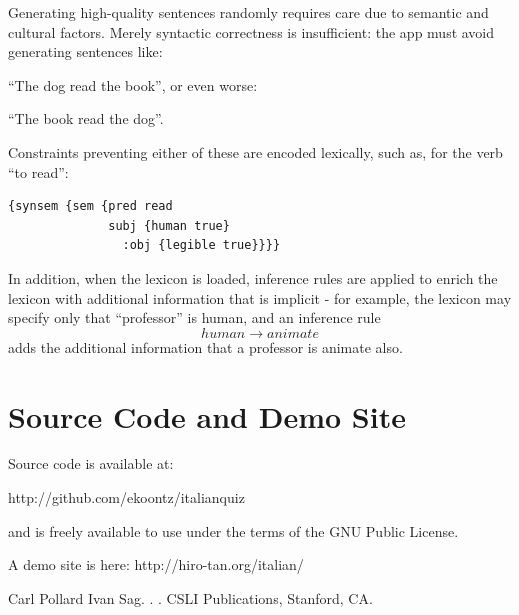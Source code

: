 \documentclass[11pt]{article}
\begin{document}
Generating high-quality sentences randomly requires care due to
semantic and cultural factors. Merely syntactic correctness is
insufficient: the app must avoid generating sentences like:

``The dog read the book'', or even worse:

``The book read the dog''. 

Constraints preventing either of these are encoded lexically, such as,
 for the verb ``to read'':

\begin{verbatim}
{synsem {sem {pred read
              subj {human true}
                :obj {legible true}}}}
\end{verbatim}

In addition, when the lexicon is loaded, inference rules are applied
to enrich the lexicon with additional information that is implicit -
for example, the lexicon may specify only that ``professor'' is human,
and an inference rule $$ human \rightarrow animate $$ adds the
additional information that a professor is animate also.

\section{Source Code and Demo Site}

Source code is available at:

http://github.com/ekoontz/italianquiz

and is freely available to use under the terms of the GNU Public
License.

A demo site is here: http://hiro-tan.org/italian/

\begin{thebibliography}{}

Carl Pollard Ivan Sag.
.
.
\newblock CSLI Publications, Stanford, CA.
\end{thebibliography}
\end{document}
